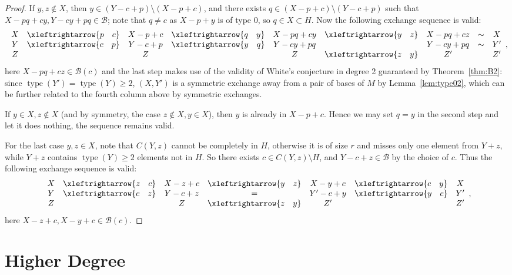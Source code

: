 \documentclass{amsart}
\newcommand{\swap}[2]{\xleftrightarrow{#1 \quad #2}}
\newcommand\Bcal{{\mathcal B}}
\DeclareMathOperator{\type}{type}
\begin{document}
\begin{proof}
If $y,z\not\in X$, then $y\in (Y-c+p)\setminus (X-p+c)$, and there exists $q\in (X-p+c)\setminus (Y-c+p)$ such that $X-pq+cy, Y-cy+pq\in\Bcal$; note that $q\neq c$ as $X-p+y$ is of type 0, so $q\in X\subset H$. Now the following exchange sequence is valid:
$$
        \begin{array}{c c c c c c c c c}
           X   & \swap{p}{c} & X - p + c 
               & \swap{q}{y} & X - pq + cy 
               & \swap{y}{z} & X - pq + cz & \sim & X\\ 
           Y   & \swap{c}{p} & Y - c + p 
               & \swap{y}{q} & Y - cy + pq 
               &             & Y - cy + pq & \sim & Y'\\
           Z   &             & Z 
               &             & Z 
               & \swap{z}{y} & Z'  &     & Z'
        \end{array},
$$
here $X - pq + cz\in\Bcal(c)$ and the last step makes use of the validity of White's conjecture in degree 2 guaranteed by Theorem~\ref{thm:B2}: since $\type(Y')=\type(Y)\geq 2$, $(X,Y')$ is a symmetric exchange away from a pair of bases of $M$ by Lemma~\ref{lem:type02}, which can be further related to the fourth column above by symmetric exchanges.

If $y\in X, z\not\in X$ (and by symmetry, the case $z\not\in X, y\in X$), then $y$ is already in $X-p+c$. Hence we may set $q=y$ in the second step and let it does nothing, the sequence remains valid.

For the last case $y,z\in X$, note that $C(Y,z)$ cannot be completely in $H$, otherwise it is of size $r$ and misses only one element from $Y+z$, while $Y+z$ contains $\type(Y)\geq 2$ elements not in $H$. So there exists $c\in C(Y,z)\setminus H$, and $Y - c + z \in \Bcal$ by the choice of $c$. Thus the following exchange sequence is valid:
$$
    \begin{array}{c c c c c c c}
        X   & \swap{z}{c}  & X - z + c 
            & \swap{y}{z}  & X - y + c 
            & \swap{c}{y}  & X \\
        Y   & \swap{c}{z}  & Y - c + z 
            & =        & Y' - c + y 
            & \swap{y}{c}  & Y' \\
        Z   &              & Z 
            & \swap{z}{y}  & Z' 
            &              & Z'
        \end{array},
$$
here $X-z+c,X-y+c\in\Bcal(c)$.
\end{proof}

\section{Higher Degree}
\end{document}
